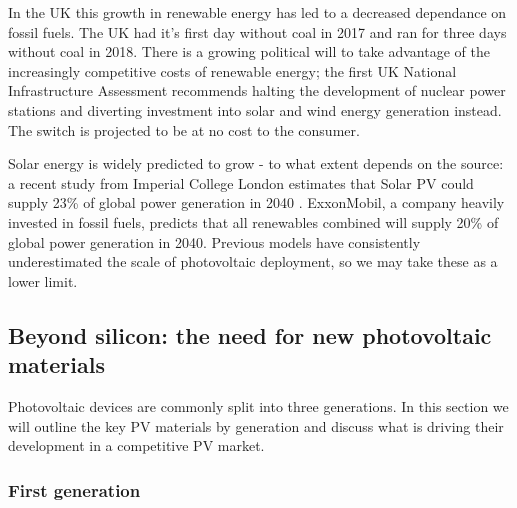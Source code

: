 In the UK this growth in renewable energy has led to a decreased dependance on fossil fuels. The UK had it's first day without coal in 2017\autocite{Brown2017} and ran for three days without coal in 2018.\autocite{Vaughan2018} There is a growing political will to take advantage of the increasingly competitive costs of renewable energy; the first UK National Infrastructure Assessment\autocite{NIA2018} recommends halting the development of nuclear power stations and diverting investment into solar and wind energy generation instead. The switch is projected to be at no cost to the consumer.

Solar energy is widely predicted to grow - to what extent depends on the source: a recent study from Imperial College London estimates that Solar PV could supply 23\% of global power generation in 2040 \autocite{Grantham2017}. ExxonMobil, a company heavily invested in fossil fuels, predicts that all renewables combined will supply 20\% of global power generation in 2040.\autocite{exxon2018} Previous models have consistently underestimated the scale of photovoltaic deployment,\autocite{Creutzig2017} so we may take these as a lower limit.

\subsection{Beyond silicon: the need for new photovoltaic materials}

Photovoltaic devices are commonly split into three generations. In this section we will outline the key PV materials by generation and discuss what is driving their development in a competitive PV market.

\subsubsection{First generation}

